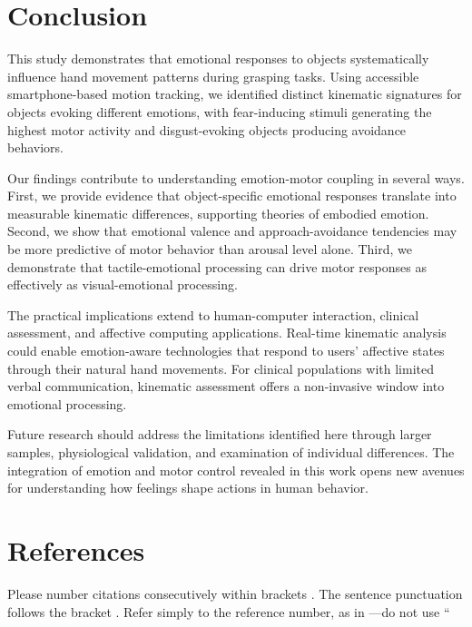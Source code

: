 \documentclass[conference]{IEEEtran}
\begin{document}
\section{Conclusion}
\label{sec:conclusion}

This study demonstrates that emotional responses to objects systematically 
influence hand movement patterns during grasping tasks. Using accessible 
smartphone-based motion tracking, we identified distinct kinematic signatures 
for objects evoking different emotions, with fear-inducing stimuli generating 
the highest motor activity and disgust-evoking objects producing avoidance 
behaviors.

Our findings contribute to understanding emotion-motor coupling in several ways. 
First, we provide evidence that object-specific emotional responses translate 
into measurable kinematic differences, supporting theories of embodied emotion. 
Second, we show that emotional valence and approach-avoidance tendencies may 
be more predictive of motor behavior than arousal level alone. Third, we 
demonstrate that tactile-emotional processing can drive motor responses as 
effectively as visual-emotional processing.

The practical implications extend to human-computer interaction, clinical 
assessment, and affective computing applications. Real-time kinematic analysis 
could enable emotion-aware technologies that respond to users' affective states 
through their natural hand movements. For clinical populations with limited 
verbal communication, kinematic assessment offers a non-invasive window into 
emotional processing.

Future research should address the limitations identified here through larger 
samples, physiological validation, and examination of individual differences. 
The integration of emotion and motor control revealed in this work opens new 
avenues for understanding how feelings shape actions in human behavior.

\section*{References}

Please number citations consecutively within brackets \cite{b1}. The 
sentence punctuation follows the bracket \cite{b2}. Refer simply to the reference 
number, as in \cite{b3}---do not use ``
\end{document}
